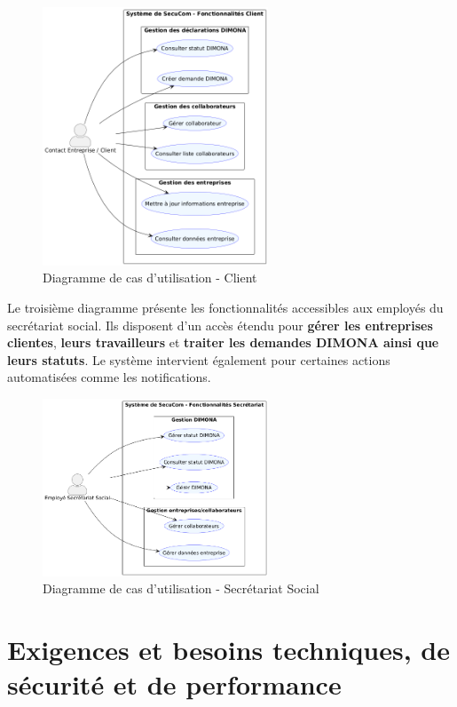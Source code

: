 \vspace{0.5cm}
\begin{figure}[h]
\centering
\includegraphics[width=0.6\textwidth]{ClientUC.png}
\caption{Diagramme de cas d'utilisation - Client}
\end{figure}

\noindent Le troisième diagramme présente les fonctionnalités accessibles aux employés du secrétariat social. Ils disposent d'un accès étendu pour \textbf{gérer les entreprises clientes}, \textbf{leurs travailleurs} et \textbf{traiter les demandes DIMONA ainsi que leurs statuts}. Le système intervient également pour certaines actions automatisées comme les notifications.

\vspace{0.5cm}
\begin{figure}[h]
\centering
\includegraphics[width=0.6\textwidth]{SecretariatUC.png}
\caption{Diagramme de cas d'utilisation - Secrétariat Social}
\end{figure}

\section{Exigences et besoins techniques, de sécurité et de performance}

